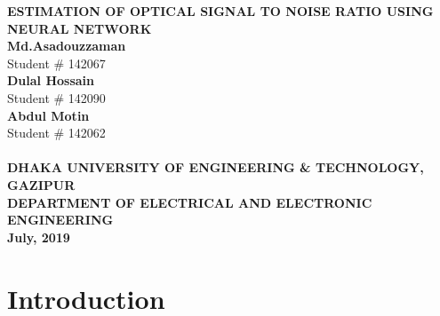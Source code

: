 \documentclass[12pt]{report}
\begin{document}
	\begin{titlepage}
		\begin{center}
			\LARGE {\bfseries {ESTIMATION OF OPTICAL SIGNAL TO NOISE RATIO USING NEURAL NETWORK}}\\[1.5cm]
			\normalsize 
			\textbf{Md.Asadouzzaman}\\
			Student \# 142067\\
			\textbf{Dulal Hossain}\\
			Student \# 142090\\
			\textbf{Abdul Motin}\\
			Student \# 142062\\[2cm]
			\\[3cm]
			\Large \bfseries {DHAKA UNIVERSITY OF ENGINEERING \& TECHNOLOGY, GAZIPUR}\\
			\large \bfseries {DEPARTMENT OF ELECTRICAL AND ELECTRONIC ENGINEERING}\\
			\textbf{July, 2019}
		\end{center}
	\end{titlepage}

\tableofcontents
\listoffigures




\chapter{Introduction}
\end{document}
